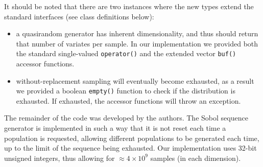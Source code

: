 \documentclass[]{article}
\begin{document}
It should be noted that there are two instances where the new types
extend the standard interfaces (see class definitions below):

\begin{itemize}
\item
  a quasirandom generator has inherent dimensionality, and thus should
  return that number of variates per sample. In our implementation we
  provided both the standard single-valued \texttt{operator()} and the
  extended vector \texttt{buf()} accessor functions.
\item
  without-replacement sampling will eventually become exhausted, as a
  result we provided a boolean \texttt{empty()} function to check if the
  distribution is exhausted. If exhausted, the accessor functions will
  throw an exception.
\end{itemize}

The remainder of the code was developed by the authors. The Sobol
sequence generator is implemented in such a way that it is not reset
each time a population is requested, allowing different populations to
be generated each time, up to the limit of the sequence being exhausted.
Our implementation uses 32-bit unsigned integers, thus allowing for
\(\approx4\times10^9\) samples (in each dimension).
\end{document}
